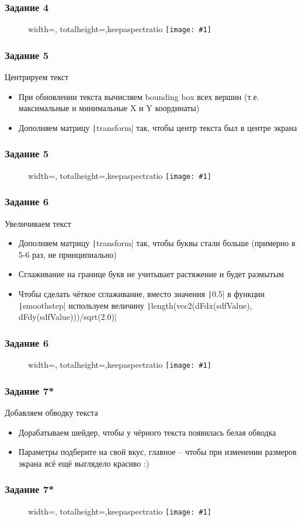 \documentclass{beamer}
\newcommand{\slideimage}[1]{
  \begin{figure}
    \begin{adjustbox}{width=\textwidth, totalheight=\textheight-2\baselineskip-2\baselineskip,keepaspectratio}
      \texttt{[image: \#1]}
    \end{adjustbox}
  \end{figure}
}
\begin{document}
\begin{frame}
\frametitle{Задание 4}
\slideimage{4.png}
\end{frame}

\begin{frame}[fragile]
\frametitle{Задание 5}
Центрируем текст
\begin{itemize}
\item При обновлении текста вычисляем bounding box всех вершин (т.е. максимальные и минимальные X и Y координаты)
\item Дополняем матрицу \texttt|transform| так, чтобы центр текста был в центре экрана
\end{itemize}
\end{frame}

\begin{frame}
\frametitle{Задание 5}
\slideimage{5.png}
\end{frame}

\begin{frame}[fragile]
\frametitle{Задание 6}
Увеличиваем текст
\begin{itemize}
\item Дополняем матрицу \texttt|transform| так, чтобы буквы стали больше (примерно в 5-6 раз, не принципиально)
\item Сглаживание на границе букв не учитывает растяжение и будет размытым
\item Чтобы сделать чёткое сглаживание, вместо значения \texttt|0.5| в функции \texttt|smoothstep| используем величину \texttt|length(vec2(dFdx(sdfValue), dFdy(sdfValue)))/sqrt(2.0)|
\end{itemize}
\end{frame}

\begin{frame}
\frametitle{Задание 6}
\slideimage{6.png}
\end{frame}

\begin{frame}[fragile]
\frametitle{Задание 7*}
Добавляем обводку текста
\begin{itemize}
\item Дорабатываем шейдер, чтобы у чёрного текста появилась белая обводка
\item Параметры подберите на свой вкус, главное -- чтобы при изменении размеров экрана всё ещё выглядело красиво :)
\end{itemize}
\end{frame}

\begin{frame}
\frametitle{Задание 7*}
\slideimage{7.png}
\end{frame}
\end{document}

